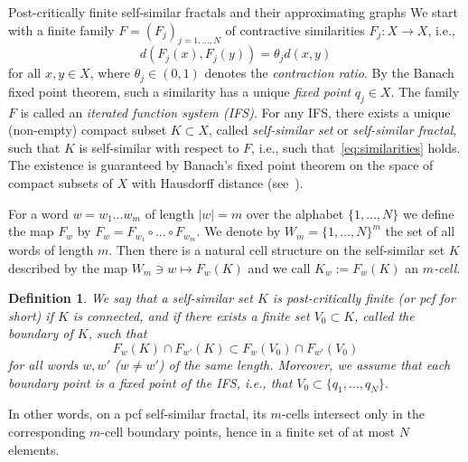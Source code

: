 \documentclass[12pt,reqno,a4paper]{amsart}            %
\makeatletter
\numberwithin{equation}{section}
\newcommand{\myfont}{\sffamily}
\theoremstyle{mythmstyle}       %
\theoremstyle{mydefstyle}        %
\newtheorem{definition}[theorem]{Definition}
\renewcommand\subsection{\@startsection{subsection}{2}%
  \z@{-.5\linespacing\@plus-.7\linespacing}{.5\linespacing}%
  {\large\myfont\bfseries}}
\newcommand{\map}[3]{ #1 \colon #2 \longrightarrow #3}    %
\newcommand{\1}{\mathbbm 1}                    %
\newcommand{\pcf}{pcf\xspace}
\makeatother
\begin{document}
\subsection{Post-critically finite self-similar fractals and their
  approximating graphs}
We start with a finite family $F=(F_j)_{j=1,\dots,N}$ of contractive
similarities $\map{F_j}X X$, i.e.,
\begin{equation*}
  d(F_j(x),F_j(y))=\theta_jd(x,y)
\end{equation*}
for all $x,y \in X$, where $\theta_j \in (0,1)$ denotes the
\emph{contraction ratio}.  By the Banach fixed point theorem, such a
similarity has a unique \emph{fixed point} $q_j \in X$.  The family
$F$ is called an \emph{iterated function system (IFS)}.  For any IFS,
there exists a unique (non-empty) compact subset $K \subset X$, called
\emph{self-similar set} or \emph{self-similar fractal}, such that $K$
is self-similar with respect to $F$, i.e., such
that~\eqref{eq:similarities} holds.  The existence is guaranteed by
Banach's fixed point theorem on the space of compact subsets of $X$
with Hausdorff distance (see~\cite[Thm.~1.1.7]{kigami:01}).

For a word $w=w_1\dots w_m$ of length $|w|=m$ over the alphabet
$\{1,\dots,N\}$ we define the map $F_w$ by $F_w=F_{w_1}\circ\dots\circ
F_{w_m}$. We denote by $W_m=\{1,\dots,N\}^m$ the set of all words of
length $m$.  Then there is a natural cell structure on the
self-similar set $K$ described by the map $W_m\ni w\mapsto F_w(K)$ and
we call $K_w:=F_w(K)$ an \emph{$m$-cell}.

\begin{definition}
  \label{def:pcf}
  We say that a self-similar set $K$ is \emph{post-critically finite}
  (or \emph \pcf for short) if $K$ is connected, and if there exists
  a finite set $V_0 \subset K$, called the \emph{boundary} of $K$,
  such that
  \begin{equation*}
    F_w(K) \cap F_{w'}(K) 
    \subset F_w(V_0) \cap F_{w'}(V_0)
  \end{equation*}
  for all words $w, w'$ ($w \ne w'$) of the same length.  Moreover, we
  assume that each boundary point is a fixed point of the IFS, i.e.,
  that $V_0 \subset \{q_1,\dots,q_N\}$.
\end{definition}
In other words, on a \pcf self-similar fractal, its $m$-cells
intersect only in the corresponding $m$-cell boundary points, hence in
a finite set of at most $N$ elements.
\end{document}
